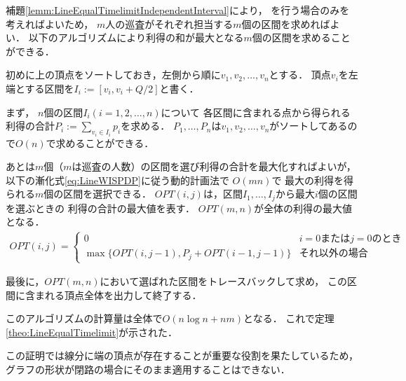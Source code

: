 補題\ref{lemm:LineEqualTimelimitIndependentInterval}により，
{\indSectOperation}を行う場合のみを考えればよいため，
$m$人の巡査がそれぞれ担当する$m$個の区間を求めればよい．
以下のアルゴリズムにより利得の和が最大となる$m$個の区間を求めることができる．

初めに{\graphLine}上の頂点をソートしておき，左側から順に$v_1, v_2, \ldots, v_n$とする．
頂点$v_i$を左端とする区間を$I_i := [v_i, v_i + Q/2]$と書く．

まず，
$n$個の区間$I_i (i = 1,2,\ldots, n)$について
各区間に含まれる点から得られる利得の合計$P_i := \sum_{v_i \in I_i} p_i$を求める．
$P_1, \ldots, P_n$は$v_1, v_2, \ldots, v_n$がソートしてあるので$O(n)$で求めることができる．

あとは$m$個（$m$は巡査の人数）の区間を選び利得の合計を最大化すればよいが，
以下の漸化式\ref{eq:LineWISPDP}に従う動的計画法で
$O(mn)$で
最大の利得を得られる$m$個の区間を選択できる．
$OPT(i,j)$は，区間$I_1, \ldots, I_j$から最大$i$個の区間を選ぶときの
利得の合計の最大値を表す．
$OPT(m,n)$が全体の利得の最大値となる．
\begin{align}
  \label{eq:LineWISPDP}
  OPT(i,j) = 
  \begin{cases}
    0 & \text{$i = 0$または$j = 0$のとき} \\
    \max \{
      OPT(i, j - 1), 
      P_j + OPT(i - 1, j - 1)
    \}
    & \text{それ以外の場合}
  \end{cases}
\end{align}

最後に，$OPT(m,n)$において選ばれた区間をトレースバックして求め，
この区間に含まれる頂点全体を出力して終了する．

このアルゴリズムの計算量は全体で$O(n \log n + nm)$となる．
これで定理\ref{theo:LineEqualTimelimit}が示された．


この証明では線分に端の頂点が存在することが重要な役割を果たしているため，
グラフの形状が閉路の場合にそのまま適用することはできない．
